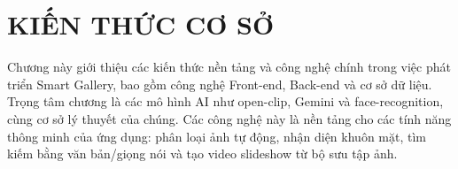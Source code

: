 \chapter{KIẾN THỨC CƠ SỞ}
Chương này giới thiệu các kiến thức nền tảng và công nghệ chính trong việc phát triển Smart Gallery, bao gồm công nghệ Front-end, Back-end và cơ sở dữ liệu. Trọng tâm chương là các mô hình AI như open-clip, Gemini và face-recognition, cùng cơ sở lý thuyết của chúng. Các công nghệ này là nền tảng cho các tính năng thông minh của ứng dụng: phân loại ảnh tự động, nhận diện khuôn mặt, tìm kiếm bằng văn bản/giọng nói và tạo video slideshow từ bộ sưu tập ảnh.














